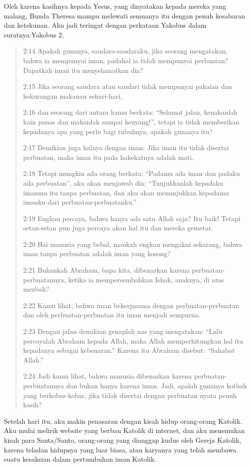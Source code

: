 Oleh karena kasihnya kepada Yesus, yang dinyatakan kepada mereka yang malang, Bunda Theresa mampu melewati semuanya itu dengan penuh kesabaran dan ketekunan.
Aku jadi teringat dengan perkataan Yakobus dalam suratnya:Yakobus 2, 
\begin{quote}
2:14 Apakah gunanya, saudara-saudaraku, jika seorang mengatakan, bahwa ia mempunyai iman, padahal ia tidak mempunyai perbuatan? Dapatkah iman itu menyelamatkan dia?

2:15 Jika seorang saudara atau saudari tidak mempunyai pakaian dan kekurangan makanan sehari-hari,

2:16 dan seorang dari antara kamu berkata: “Selamat jalan, kenakanlah kain panas dan makanlah sampai kenyang!”, tetapi ia tidak memberikan kepadanya apa yang perlu bagi tubuhnya, apakah gunanya itu?

2:17 Demikian juga halnya dengan iman: Jika iman itu tidak disertai perbuatan, maka iman itu pada hakekatnya adalah mati.

2:18 Tetapi mungkin ada orang berkata: “Padamu ada iman dan padaku ada perbuatan”, aku akan menjawab dia: “Tunjukkanlah kepadaku imanmu itu tanpa perbuatan, dan aku akan menunjukkan kepadamu imanku dari perbuatan-perbuatanku.”

2:19 Engkau percaya, bahwa hanya ada satu Allah saja? Itu baik! Tetapi setan-setan pun juga percaya akan hal itu dan mereka gemetar.

2:20 Hai manusia yang bebal, maukah engkau mengakui sekarang, bahwa iman tanpa perbuatan adalah iman yang kosong?

2:21 Bukankah Abraham, bapa kita, dibenarkan karena perbuatan-perbuatannya, ketika ia mempersembahkan Ishak, anaknya, di atas mezbah?

2:22 Kamu lihat, bahwa iman bekerjasama dengan perbuatan-perbuatan dan oleh perbuatan-perbuatan itu iman menjadi sempurna.

2:23 Dengan jalan demikian genaplah nas yang mengatakan: “Lalu percayalah Abraham kepada Allah, maka Allah memperhitungkan hal itu kepadanya sebagai kebenaran.” Karena itu Abraham disebut: “Sahabat Allah.”

2:24 Jadi kamu lihat, bahwa manusia dibenarkan karena perbuatan-perbuatannya dan bukan hanya karena iman.
Jadi, apalah gunanya kotbah yang berkobar-kobar, jika tidak disertai dengan perbuatan nyata penuh kasih?
\end{quote}

Setelah hari itu, aku makin penasaran dengan kisah hidup orang-orang Katolik. Aku mulai melirik website yang berbau Katolik di internet, dan aku menemukan kisah para Santa/Santo, orang-orang yang dianggap kudus oleh Gereja Katolik, karena teladan hidupnya yang luar biasa, atau karyanya yang telah membawa suatu kesaksian dalam pertumbuhan iman Katolik.

